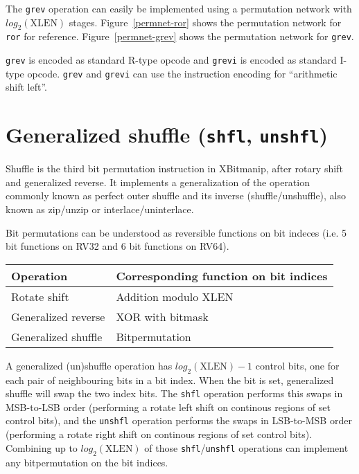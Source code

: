 The {\tt grev} operation can easily be implemented using a permutation
network with $log_2(\textrm{XLEN})$ stages. Figure~\ref{permnet-ror}
shows the permutation network for {\tt ror} for reference.
Figure~\ref{permnet-grev} shows the permutation network for {\tt grev}.



\texttt{grev} is encoded as standard R-type opcode and \texttt{grevi} is
encoded as standard I-type opcode. \texttt{grev} and \texttt{grevi} can
use the instruction encoding for ``arithmetic shift left''.

%
%
%


\section{Generalized shuffle (\texttt{shfl}, \texttt{unshfl})}
\label{gzip}

Shuffle is the third bit permutation instruction in XBitmanip, after rotary
shift and generalized reverse.  It implements a generalization of the operation
commonly known as perfect outer shuffle and its inverse (shuffle/unshuffle),
also known as zip/unzip or interlace/uninterlace.

Bit permutations can be understood as reversible functions on bit indeces (i.e.
5 bit functions on RV32 and 6 bit functions on RV64).

\begin{center}
\begin{tabular}{l l}
Operation & Corresponding function on bit indices \\
\hline
Rotate shift & Addition modulo {\rm XLEN} \\
Generalized reverse & XOR with bitmask \\
Generalized shuffle & Bitpermutation \\
\end{tabular}
\end{center}

A generalized (un)shuffle operation has $log_2(\textrm{XLEN})-1$ control bits,
one for each pair of neighbouring bits in a bit index. When the bit is set,
generalized shuffle will swap the two index bits. The {\tt shfl} operation
performs this swaps in MSB-to-LSB order (performing a rotate left shift on
continous regions of set control bits), and the {\tt unshfl} operation performs
the swaps in LSB-to-MSB order (performing a rotate right shift on continous
regions of set control bits). Combining up to $log_2(\textrm{XLEN})$ of those
{\tt shfl}/{\tt unshfl} operations can implement any bitpermutation on the
bit indices.

